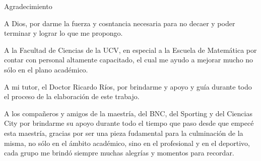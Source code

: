 \vspace*{2.5cm}

\begin{center}
{\large Agradecimiento}
\end{center}
\vspace{1cm}

\hspace*{0.4 cm} A Dios, por darme la fuerza y cosntancia necesaria para no decaer y poder terminar y lograr lo que me propongo.

\hspace*{0.4 cm} A la Facultad de Ciencias de la UCV, en especial a la Escuela de Matem\'atica por contar con personal altamente capacitado, el cual me ayudo a mejorar mucho no s\'olo en el plano acad\'emico.

\hspace*{0.4 cm} A mi tutor, el Doctor Ricardo R\'ios, por brindarme y apoyo y gu\'ia durante todo el proceso de la elaboraci\'on de este trabajo.

\hspace*{0.4 cm} A los compa\~neros y amigos de la maestr\'ia, del BNC, del Sporting y del Ciencias City por brindarme su apoyo durante todo el tiempo que paso desde que empec\'e esta maestr\'ia,  gracias por ser una pieza fudamental para la culminaci\'on de la misma, no s\'olo en el \'ambito acad\'emico, sino en el profesional y en el deportivo, cada grupo me brind\'o siempre muchas alegr\'ias y momentos para recordar.





\newpage
